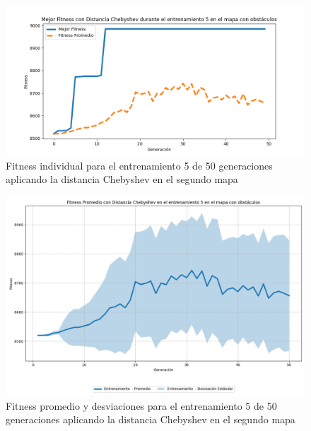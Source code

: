 \documentclass[conference]{IEEEtran}
\begin{document}
\begin{figure}[H]
    \centering
    \includegraphics[width=0.9 \linewidth]{Chebyshev/Mapa2/Fitness_5_Map2_Cheby_50Gen.png}
    \caption{Fitness individual para el entrenamiento 5 de 50 generaciones aplicando la distancia Chebyshev en el segundo mapa}
    \label{fig:cheb_5_50_m2}
\end{figure}
\begin{figure}[H]
    \centering
    \includegraphics[width=0.9 \linewidth]{Chebyshev/Mapa2/Fitness_5_Map2_Cheby_50Gen_Sombra.png}
    \caption{Fitness promedio y desviaciones para el entrenamiento 5 de 50 generaciones aplicando la distancia Chebyshev en el segundo mapa}
    \label{fig:cheb_5_50_sombra_m2}
\end{figure}
\end{document}
